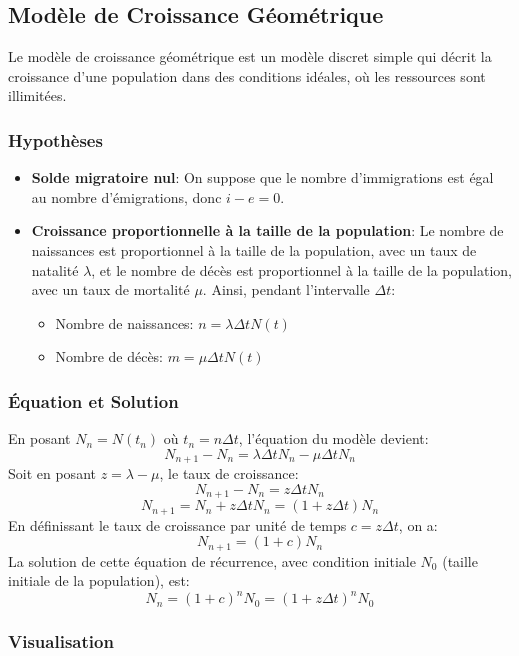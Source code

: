\documentclass{article}
\begin{document}
\subsection{Modèle de Croissance Géométrique}

Le modèle de croissance géométrique est un modèle discret simple qui décrit la croissance d'une population dans des conditions idéales, où les ressources sont illimitées.

\subsubsection{Hypothèses}

\begin{itemize}
    \item \textbf{Solde migratoire nul}: On suppose que le nombre d'immigrations est égal au nombre d'émigrations, donc $i - e = 0$.
    \item \textbf{Croissance proportionnelle à la taille de la population}: Le nombre de naissances est proportionnel à la taille de la population, avec un taux de natalité $\lambda$, et le nombre de décès est proportionnel à la taille de la population, avec un taux de mortalité $\mu$. Ainsi, pendant l'intervalle $\Delta t$:
    \begin{itemize}
        \item Nombre de naissances: $n = \lambda \Delta t N(t)$
        \item Nombre de décès: $m = \mu \Delta t N(t)$
    \end{itemize}
\end{itemize}

\subsubsection{Équation et Solution}

En posant $N_n = N(t_n)$ où $t_n = n \Delta t$, l'équation du modèle devient:
\[
N_{n+1} - N_n = \lambda \Delta t N_n - \mu \Delta t N_n
\]
Soit en posant $z = \lambda - \mu$, le taux de croissance:
\[
N_{n+1} - N_n = z \Delta t N_n
\]
\[
N_{n+1} = N_n + z \Delta t N_n = (1 + z \Delta t) N_n
\]
En définissant le taux de croissance par unité de temps $c = z \Delta t$, on a:
\[
N_{n+1} = (1 + c) N_n
\]
La solution de cette équation de récurrence, avec condition initiale $N_0$ (taille initiale de la population), est:
\[
N_n = (1 + c)^n N_0 = (1 + z \Delta t)^n N_0
\]

\subsubsection{Visualisation}
\end{document}
